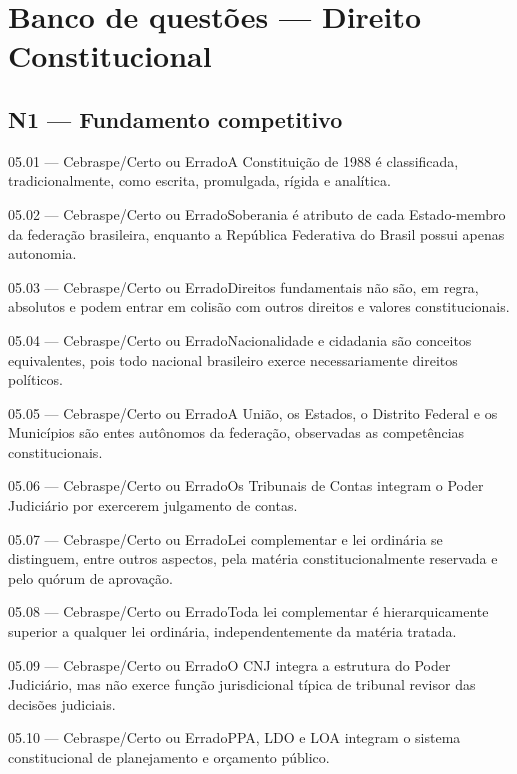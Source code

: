 \section{Banco de questões — Direito Constitucional}

\subsection*{N1 — Fundamento competitivo}
\begin{questao}{ 05.01 — Cebraspe/Certo ou Errado}A Constituição de 1988 é classificada, tradicionalmente, como escrita, promulgada, rígida e analítica.\end{questao}
\begin{questao}{ 05.02 — Cebraspe/Certo ou Errado}Soberania é atributo de cada Estado-membro da federação brasileira, enquanto a República Federativa do Brasil possui apenas autonomia.\end{questao}
\begin{questao}{ 05.03 — Cebraspe/Certo ou Errado}Direitos fundamentais não são, em regra, absolutos e podem entrar em colisão com outros direitos e valores constitucionais.\end{questao}
\begin{questao}{ 05.04 — Cebraspe/Certo ou Errado}Nacionalidade e cidadania são conceitos equivalentes, pois todo nacional brasileiro exerce necessariamente direitos políticos.\end{questao}
\begin{questao}{ 05.05 — Cebraspe/Certo ou Errado}A União, os Estados, o Distrito Federal e os Municípios são entes autônomos da federação, observadas as competências constitucionais.\end{questao}
\begin{questao}{ 05.06 — Cebraspe/Certo ou Errado}Os Tribunais de Contas integram o Poder Judiciário por exercerem julgamento de contas.\end{questao}
\begin{questao}{ 05.07 — Cebraspe/Certo ou Errado}Lei complementar e lei ordinária se distinguem, entre outros aspectos, pela matéria constitucionalmente reservada e pelo quórum de aprovação.\end{questao}
\begin{questao}{ 05.08 — Cebraspe/Certo ou Errado}Toda lei complementar é hierarquicamente superior a qualquer lei ordinária, independentemente da matéria tratada.\end{questao}
\begin{questao}{ 05.09 — Cebraspe/Certo ou Errado}O CNJ integra a estrutura do Poder Judiciário, mas não exerce função jurisdicional típica de tribunal revisor das decisões judiciais.\end{questao}
\begin{questao}{ 05.10 — Cebraspe/Certo ou Errado}PPA, LDO e LOA integram o sistema constitucional de planejamento e orçamento público.\end{questao}

